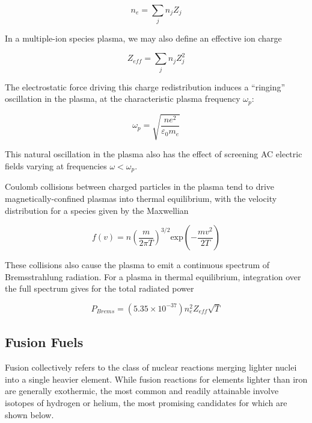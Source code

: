 \begin{equation}\label{eq:quasineutral}
 n_e = \sum_j{n_j Z_j}
\end{equation}

\noindent In a multiple-ion species plasma, we may also define an effective ion charge

\begin{equation}\label{eq:Zeff}
 Z_{eff} = \sum_j{n_j Z_j^2}
\end{equation}

The electrostatic force driving this charge redistribution induces a ``ringing'' oscillation in the plasma, at the characteristic plasma frequency $\omega_p$:

\begin{equation}\label{eq:omegap}
 \omega_p = \sqrt{ \frac{ne^2}{\varepsilon_0 m_e} }
\end{equation}

\noindent This natural oscillation in the plasma also has the effect of screening AC electric fields varying at frequencies $\omega < \omega_p$.

Coulomb collisions between charged particles in the plasma tend to drive magnetically-confined plasmas into thermal equilibrium, with the velocity distribution for a species given by the Maxwellian

\begin{equation}\label{eq:maxwell}
 f(v) = n \left( \frac{m}{2\pi T} \right)^{3/2} \mbox{exp}\left(-\frac{mv^2}{2T} \right)
\end{equation}

\noindent These collisions also cause the plasma to emit a continuous spectrum of Bremsstrahlung radiation.  For a plasma in thermal equilibrium, integration over the full spectrum gives for the total radiated power

\begin{equation}\label{eq:brems}
 P_{Brems} = \left( 5.35 \times 10^{-37} \right) n_e^2 Z_{eff} \sqrt{T}
\end{equation}

\subsection{Fusion Fuels}\label{subsec:intro_fuels}

Fusion collectively refers to the class of nuclear reactions merging lighter nuclei into a single heavier element.  While fusion reactions for elements lighter than iron are generally exothermic, the most common and readily attainable involve isotopes of hydrogen or helium, the most promising candidates for which are shown below.

